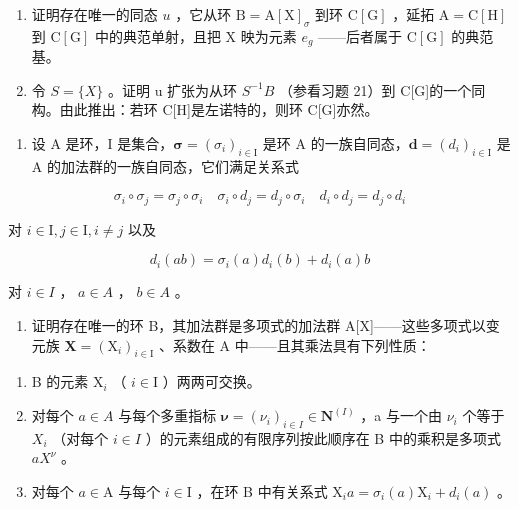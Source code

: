 \begin{enumerate}
\def\labelenumi{\alph{enumi})}
\item
  证明存在唯一的同态 \(u\) ，它从环 \(\mathrm{B} = \mathrm{A}[\mathrm{X}]_{\sigma}\) 到环 \(\mathrm{C}[\mathrm{G}]\) ，延拓 \(\mathrm{A} = \mathrm{C}[\mathrm{H}]\) 到 \(\mathrm{C}[\mathrm{G}]\) 中的典范单射，且把 \(\mathrm{X}\) 映为元素 \(e_g\) ——后者属于 \(\mathrm{C}[\mathrm{G}]\) 的典范基。
\item
  令 \(S = \{X\}\) 。证明 u 扩张为从环 \(S^{-1}B\) （参看习题 21）到 C{[}G{]}的一个同构。由此推出：若环 C{[}H{]}是左诺特的，则环 C{[}G{]}亦然。
\end{enumerate}

\begin{enumerate}
\def\labelenumi{\arabic{enumi})}
\setcounter{enumi}{22}
\tightlist
\item
  设 A 是环，I 是集合，\(\symbf{\sigma} = (\sigma_{i})_{i \in \mathrm{I}}\) 是环 A 的一族自同态，\(\symbf{d} = (d_{i})_{i \in \mathrm{I}}\) 是 A 的加法群的一族自同态，它们满足关系式
\end{enumerate}

\[
\sigma_ {i} \circ \sigma_ {j} = \sigma_ {j} \circ \sigma_ {i} \quad \sigma_ {i} \circ d _ {j} = d _ {j} \circ \sigma_ {i} \quad d _ {i} \circ d _ {j} = d _ {j} \circ d _ {i}
\]

对 \(i\in \mathrm{I},j\in \mathrm{I},i\neq j\) 以及

\[
d _ {i} (a b) = \sigma_ {i} (a) d _ {i} (b) + d _ {i} (a) b
\]

对 \(i \in I\) ， \(a \in A\) ， \(b \in A\) 。

\begin{enumerate}
\def\labelenumi{\alph{enumi})}
\tightlist
\item
  证明存在唯一的环 B，其加法群是多项式的加法群 A{[}X{]}——这些多项式以变元族 \(\mathbf{X} = (\mathrm{X}_{i})_{i \in \mathrm{I}}\) 、系数在 A 中——且其乘法具有下列性质：
\end{enumerate}

\begin{enumerate}
\def\labelenumi{(\roman{enumi})}
\item
  B 的元素 \(\mathrm{X}_i\) （ \(i \in \mathrm{I}\) ）两两可交换。
\item
  对每个 \(a \in A\) 与每个多重指标 \(\boldsymbol{\nu} = (\nu_i)_{i \in I} \in \mathbf{N}^{(I)}\) ，a 与一个由 \(\nu_i\) 个等于 \(X_i\) （对每个 \(i \in I\) ）的元素组成的有限序列按此顺序在 B 中的乘积是多项式 \(aX^\nu\) 。
\item
  对每个 \(a \in \mathrm{A}\) 与每个 \(i \in \mathrm{I}\) ，在环 B 中有关系式 \(\mathrm{X}_i a = \sigma_i(a)\mathrm{X}_i + d_i(a)\) 。
\end{enumerate}

